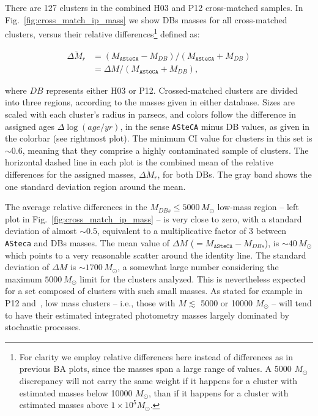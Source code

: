 \documentclass{aa}
\begin{document}
There are 127 clusters in the combined H03 and P12 cross-matched samples.
In Fig.~\ref{fig:cross_match_ip_mass} we show DBs masses for all cross-matched
clusters, versus their relative differences\footnote{For clarity we employ relative
differences here instead of differences as in previous BA plots, since the
masses span a large range of values. A 5000 $M_{\odot}$ discrepancy will not
carry the same weight if it happens for a cluster with estimated masses below 10000
$M_{\odot}$, than if it happens for a cluster with estimated masses above
$1{\times}10^5M_{\odot}$.} defined as:

\begin{equation}
\begin{split}
\overline{\Delta M_r} & = (M_{\mathtt{ASteCA}}-M_{DB})/(M_{\mathtt{ASteCA}}
+M_{DB}) \\
& = \Delta M/(M_{\mathtt{ASteCA}}+M_{DB}),
\end{split}
\label{eq:rel_diffs}
\end{equation}

\noindent where $DB$ represents either H03 or P12. Crossed-matched clusters are
divided into three regions, according to the masses given in either database.
%
Sizes are scaled with each cluster's radius in parsecs, and colors follow the
difference in assigned ages $\Delta \log(age/yr)$, in the sense \texttt{ASteCA}
minus DB values, as given in the colorbar (see rightmost plot).
The minimum CI value for clusters in this set is ${\sim}0.6$, meaning that they
comprise a highly contaminated sample of clusters.
The horizontal dashed line in each plot is the combined mean of the relative
differences for the assigned masses, $\overline{\Delta M_r}$, for both DBs.
The gray band shows the one standard deviation region around the mean.

The average relative differences in the $M_{DBs}{\le}5000\,M_{\odot}$
low-mass region -- left plot in Fig.~\ref{fig:cross_match_ip_mass} -- is very
close to zero, with a standard deviation of almost ${\sim}0.5$, equivalent to a
multiplicative factor of 3 between \texttt{ASteca} and DBs masses.
%
The mean value of $\Delta M$ (${=}M_{\mathtt{ASteCA}}-M_{DBs}$), is
${\sim}40\,M_{\odot}$ which points to a very reasonable scatter around the
identity line. The standard deviation of $\Delta M$ is ${\sim}1700\,M_{\odot}$,
a somewhat large number considering the maximum $5000\,M_{\odot}$ limit for the
clusters analyzed. This is nevertheless expected for a set composed of clusters with
such small masses.
As stated for example in P12 and~\cite{Baumgardt_2013}, low mass clusters -- i.e.,
those with $M{\lesssim}$ 5000 or 10000 $M_{\odot}$ -- will tend to have their
estimated integrated photometry masses largely dominated by stochastic
processes.
\end{document}
